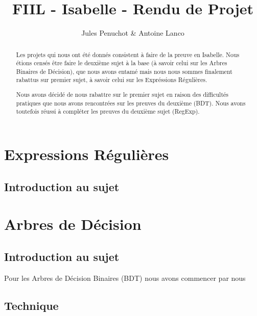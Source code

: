 \documentclass{article}
\title{FIIL - Isabelle - Rendu de Projet}
\author{Jules Penuchot \& Antoine Lanco}
\begin{document}
\maketitle

\begin{abstract}

Les projets qui nous ont été donnés consistent à faire de la preuve en Isabelle. Nous étions censés être faire le deuxième sujet à la base (à savoir celui sur les Arbres Binaires de Décision), que nous avons entamé mais nous nous sommes finalement rabattus sur premier sujet, à savoir celui sur les Expréssions Régulières.

Nous avons décidé de nous rabattre sur le premier sujet en raison des difficultés pratiques que nous avons rencontrées sur les preuves du deuxième (BDT). Nous avons toutefois réussi à compléter les preuves du deuxième sujet (RegExp).

\end{abstract}

\section{Expressions Régulières}

\subsection{Introduction au sujet}



\section{Arbres de Décision}

\subsection{Introduction au sujet}

Pour les Arbres de Décision Binaires (BDT) nous avons commencer par nous 

\subsection{Technique}
\end{document}

